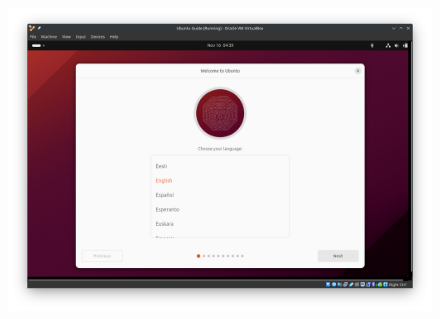\documentclass[12pt]{article}
\begin{document}
\begin{figure}[htp]
    \centering
    \includegraphics[width=\textwidth]{1-11.png}
\end{figure}
\end{document}
